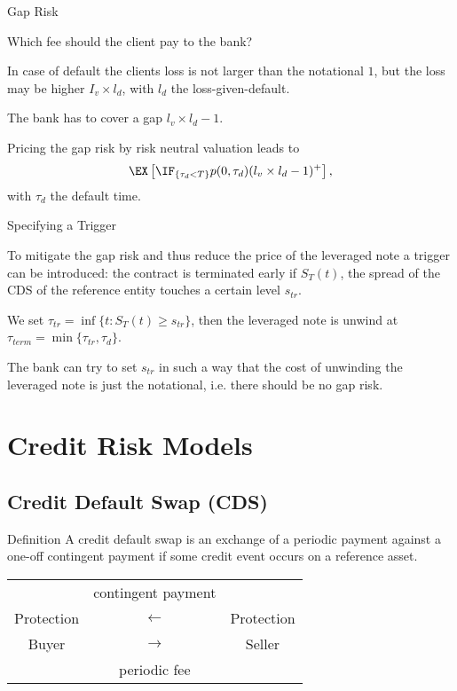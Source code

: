 {Gap Risk}
\item<1-> Which fee should the client pay to the bank?
\item<2-> In case of default the clients loss is not larger than the notational $1$, but the loss may be higher $I_v \times l_d$, with $l_d$ the loss-given-default.
\item<3-> The bank has to cover a gap $l_v \times l_d -1$.
\item<4-> Pricing the gap risk by risk neutral valuation leads to
$$
\EX\left[\IF_{\{\tau_d < T\}} p(0,\tau_d)(l_v \times l_d -1)^+\right],
$$
with $\tau_d$ the default time.


{Specifying a Trigger}
\item<1-> To mitigate the gap risk and thus reduce the price of the leveraged note a trigger can be introduced: the contract is terminated early if $S_T(t)$, the spread of the CDS of the reference entity touches a certain level  $s_{tr}$.
\item<2-> We set $\tau_{tr}= \inf\{t: S_T(t) \geq s_{tr}\}$, then the leveraged note is unwind at $\tau_{term}= \min\{\tau_{tr}, \tau_{d} \}$.
\item<3-> The bank can try to set $s_{tr}$ in such a way that the cost of unwinding the leveraged note is just the notational, i.e. there should be no gap risk.

\section{Credit Risk Models}
\subsection{Credit Default Swap (CDS)}

{Definition}
A credit default swap is an exchange of a periodic payment against
a one-off contingent payment if some credit event occurs on a
reference asset.

\begin{table}[htb]
\begin{center}
\begin{tabular}{ccc}
& {\small contingent payment} & \\
Protection& $\longleftarrow $ & Protection\\
Buyer & $\longrightarrow $& Seller\\
& {\small periodic fee} &
\end{tabular}
\end{center}
\end{table}

